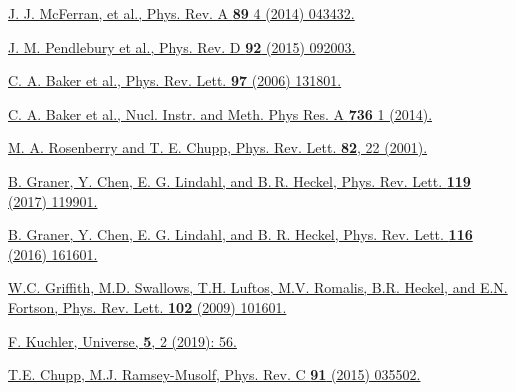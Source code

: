 \begin{thebibliography}{99}
\href{}{J. J. McFerran, et al., Phys. Rev. A \textbf{89} 4 (2014) 043432.}

 \href{https://journals.aps.org/prd/abstract/10.1103/PhysRevD.92.092003}{J. M. Pendlebury et al., Phys. Rev. D \textbf{92} (2015) 092003.}

 \href{https://journals.aps.org/prl/abstract/10.1103/PhysRevLett.97.131801}{C. A. Baker et al., Phys. Rev. Lett. \textbf{97} (2006) 131801.}

 \href{https://www.sciencedirect.com/science/article/pii/S0168900213013193}{C. A. Baker et al., Nucl. Instr. and Meth. Phys Res. A \textbf{736} 1 (2014).}

\href{https://journals.aps.org/prl/abstract/10.1103/PhysRevLett.86.22}{M. A. Rosenberry and T. E. Chupp, Phys. Rev. Lett. \textbf{82}, 22 (2001).}

\href{https://journals.aps.org/prl/abstract/10.1103/PhysRevLett.119.119901}{B. Graner, Y. Chen, E. G. Lindahl, and B. R. Heckel, Phys. Rev. Lett. \textbf{119} (2017) 119901.}

\href{https://journals.aps.org/prl/abstract/10.1103/PhysRevLett.116.161601}{B. Graner, Y. Chen, E. G. Lindahl, and B. R. Heckel, Phys. Rev. Lett. \textbf{116} (2016) 161601.}

\href{https://journals.aps.org/prl/abstract/10.1103/PhysRevLett.102.101601}{ W.C. Griffith, M.D. Swallows, T.H. Luftos, M.V. Romalis, B.R. Heckel, and E.N. Fortson, Phys. Rev. Lett. \textbf{102} (2009) 101601.}

 \href{https://www.mdpi.com/2218-1997/5/2/56}{F. Kuchler, Universe, \textbf{5}, 2 (2019): 56.}

 \href{https://journals.aps.org/prc/abstract/10.1103/PhysRevC.91.035502}{T.E. Chupp, M.J. Ramsey-Musolf, Phys. Rev. C \textbf{91} (2015) 035502.}

















\end{thebibliography}